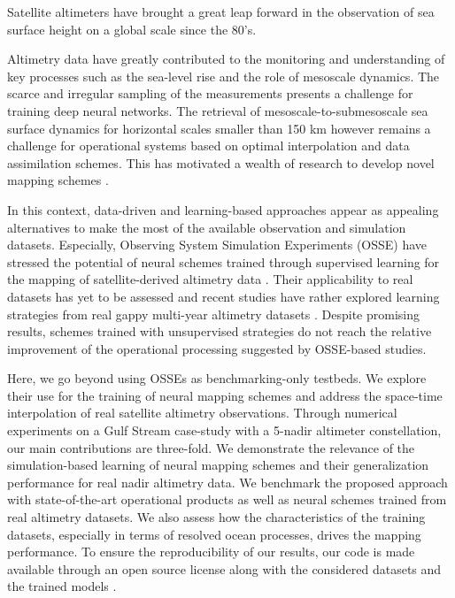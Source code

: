 \begin{bibunit}
  Satellite altimeters have brought a great leap forward in the observation of sea surface height on a global scale since the 80's. 

  
  Altimetry data have greatly contributed to the monitoring and understanding of key processes such as the sea-level rise and the role of mesoscale dynamics.
    The scarce and irregular sampling of the measurements presents a challenge for training deep neural networks.
  The retrieval of mesoscale-to-submesoscale sea surface dynamics for horizontal scales smaller than 150 km however remains a challenge for operational systems based on optimal interpolation \cite{taburetDUACSDT2018252019} and data assimilation \cite{jean-michelCopernicusGlobal122021} schemes. This has motivated a wealth of research to develop novel mapping schemes \cite{ballarottaDynamicMappingAlongTrack2020,ubelmannReconstructingOceanSurface2021,guillouMappingAltimetryForthcoming2021}.

  In this context, data-driven and learning-based approaches \cite{alveraazcarateReconstructionIncompleteOceanographic2005,barthDINCAEMultivariateConvolutional2022,lguensatAnalogDataAssimilation2017,fabletENDTOENDPHYSICSINFORMEDREPRESENTATION2021,martinSynthesizingSeaSurface2023} appear as appealing alternatives to make the most of the available observation and simulation datasets. Especially, Observing System Simulation Experiments (OSSE) have stressed the potential of neural schemes trained through supervised learning for the mapping of satellite-derived altimetry data \cite{fabletENDTOENDPHYSICSINFORMEDREPRESENTATION2021,beauchamp4DVarNetSSHEndtoendLearning2023}. 
  Their applicability to real datasets has yet to be assessed and recent studies have rather explored learning strategies from real gappy multi-year altimetry datasets \cite{martinSynthesizingSeaSurface2023}. Despite promising results, schemes trained with unsupervised strategies do not reach the relative improvement of the operational processing suggested by OSSE-based studies.
  
Here, we go beyond using OSSEs as benchmarking-only testbeds. We explore their use for the training of neural mapping schemes and address the space-time interpolation of real satellite altimetry observations. Through numerical experiments on a Gulf Stream case-study with a 5-nadir altimeter constellation, our main contributions are three-fold. We demonstrate the relevance of the simulation-based learning of neural mapping schemes and their generalization performance for real nadir altimetry data. We benchmark the proposed approach with state-of-the-art operational products as well as neural schemes trained from real altimetry datasets. We also assess how the characteristics of the training datasets, especially in terms of resolved ocean processes, drives the mapping performance.
To ensure the reproducibility of our results, our code is made available through an open source license along with the considered datasets and the trained models \cite{febvreCodeDataRelease2023a}.


\end{bibunit}
